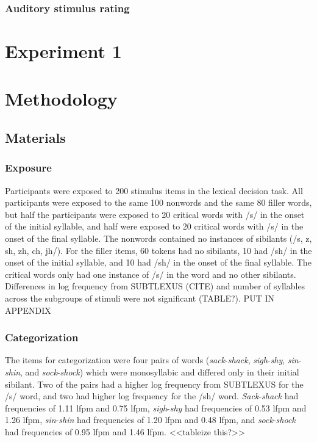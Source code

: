 \subsubsection{Auditory stimulus rating}


\section{Experiment 1}

\section{Methodology}

\subsection{Materials}

\subsubsection{Exposure}

Participants were exposed to 200 stimulus items in the lexical decision task.  All participants were exposed to the same 100 nonwords and the same 80 filler words, but half the participants were exposed to 20 critical words with /s/ in the onset of the initial syllable, and half were exposed to 20 critical words with /s/ in the onset of the final syllable.  The nonwords contained no instances of sibilants (/s, z, sh, zh, ch, jh/).  For the filler items, 60 tokens had no sibilants, 10 had /sh/ in the onset of the initial syllable, and 10 had /sh/ in the onset of the final syllable.  The critical words only had one instance of /s/ in the word and no other sibilants.  Differences in log frequency from SUBTLEXUS (CITE) and number of syllables across the subgroups of stimuli were not significant (TABLE?). PUT IN APPENDIX


\subsubsection{Categorization}

The items for categorization were four pairs of words (\emph{sack}-\emph{shack}, \emph{sigh}-\emph{shy}, \emph{sin}-\emph{shin}, and \emph{sock}-\emph{shock}) which were monosyllabic and differed only in their initial sibilant.  Two of the pairs had a higher log frequency from SUBTLEXUS for the /s/ word, and two had higher log frequency for the /sh/ word.  \emph{Sack}-\emph{shack} had frequencies of 1.11 lfpm and 0.75 lfpm, \emph{sigh}-\emph{shy} had frequencies of 0.53 lfpm and 1.26 lfpm, \emph{sin}-\emph{shin} had frequencies of 1.20 lfpm and 0.48 lfpm, and \emph{sock}-\emph{shock} had frequencies of 0.95 lfpm and 1.46 lfpm. <<tableize this?>>
	

